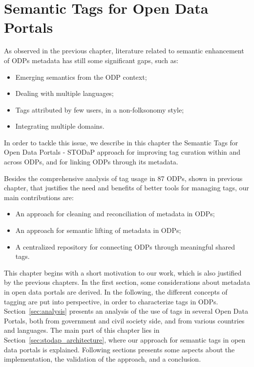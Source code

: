 \chapter{Semantic Tags for Open Data Portals}
\label{chap:tagging}


As observed in the previous chapter, literature related to semantic enhancement of ODPs metadata has still some significant gaps, such as:
\begin{itemize}
	\item Emerging semantics from the ODP context;
	\item Dealing with multiple languages;
	\item Tags attributed by few users, in a non-folksonomy style;
	\item Integrating multiple domains.
\end{itemize}

In order to	tackle this issue, we describe in this chapter the Semantic Tags for Open Data Portals - STODaP approach for improving tag curation within and across ODPs, and for linking ODPs through its metadata.

Besides the comprehensive analysis of tag usage in 87 ODPs, shown in previous chapter, that justifies the need and benefits of better tools for managing tags, our main contributions are:
\begin{itemize}
	\item An approach for cleaning and reconciliation of metadata in ODPs;
	\item An approach for semantic lifting of metadata in ODPs;
	\item A centralized repository for connecting ODPs through meaningful shared tags.
\end{itemize}

This chapter begins with a short motivation to our work, which is also justified by the previous chapters.
In the first section, some considerations about metadata in open data portals are derived. 
In the following, the different concepts of tagging are put into perspective, in order to characterize tags in ODPs. 
Section~\ref{sec:analysis} presents an analysis of the use of tags in several Open Data Portals, both from government and civil society side, and from various countries and languages.
The main part of this chapter lies in Section~\ref{sec:stodap_architecture}, where our approach for semantic tags in open data portals is explained. 
Following sections presents some aspects about the implementation, the validation of the approach, and a conclusion.

